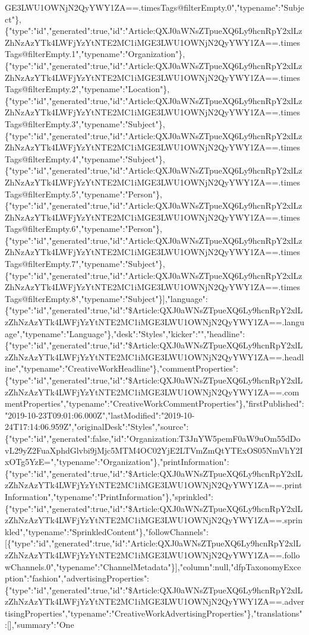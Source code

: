 GE3LWU1OWNjN2QyYWY1ZA==.timesTags@filterEmpty.0","typename":"Subject"\},\{"type":"id","generated":true,"id":"Article:QXJ0aWNsZTpueXQ6Ly9hcnRpY2xlLzZhNzAzYTk4LWFjYzYtNTE2MC1iMGE3LWU1OWNjN2QyYWY1ZA==.timesTags@filterEmpty.1","typename":"Organization"\},\{"type":"id","generated":true,"id":"Article:QXJ0aWNsZTpueXQ6Ly9hcnRpY2xlLzZhNzAzYTk4LWFjYzYtNTE2MC1iMGE3LWU1OWNjN2QyYWY1ZA==.timesTags@filterEmpty.2","typename":"Location"\},\{"type":"id","generated":true,"id":"Article:QXJ0aWNsZTpueXQ6Ly9hcnRpY2xlLzZhNzAzYTk4LWFjYzYtNTE2MC1iMGE3LWU1OWNjN2QyYWY1ZA==.timesTags@filterEmpty.3","typename":"Subject"\},\{"type":"id","generated":true,"id":"Article:QXJ0aWNsZTpueXQ6Ly9hcnRpY2xlLzZhNzAzYTk4LWFjYzYtNTE2MC1iMGE3LWU1OWNjN2QyYWY1ZA==.timesTags@filterEmpty.4","typename":"Subject"\},\{"type":"id","generated":true,"id":"Article:QXJ0aWNsZTpueXQ6Ly9hcnRpY2xlLzZhNzAzYTk4LWFjYzYtNTE2MC1iMGE3LWU1OWNjN2QyYWY1ZA==.timesTags@filterEmpty.5","typename":"Person"\},\{"type":"id","generated":true,"id":"Article:QXJ0aWNsZTpueXQ6Ly9hcnRpY2xlLzZhNzAzYTk4LWFjYzYtNTE2MC1iMGE3LWU1OWNjN2QyYWY1ZA==.timesTags@filterEmpty.6","typename":"Person"\},\{"type":"id","generated":true,"id":"Article:QXJ0aWNsZTpueXQ6Ly9hcnRpY2xlLzZhNzAzYTk4LWFjYzYtNTE2MC1iMGE3LWU1OWNjN2QyYWY1ZA==.timesTags@filterEmpty.7","typename":"Subject"\},\{"type":"id","generated":true,"id":"Article:QXJ0aWNsZTpueXQ6Ly9hcnRpY2xlLzZhNzAzYTk4LWFjYzYtNTE2MC1iMGE3LWU1OWNjN2QyYWY1ZA==.timesTags@filterEmpty.8","typename":"Subject"\}{]},"language":\{"type":"id","generated":true,"id":"\$Article:QXJ0aWNsZTpueXQ6Ly9hcnRpY2xlLzZhNzAzYTk4LWFjYzYtNTE2MC1iMGE3LWU1OWNjN2QyYWY1ZA==.language","typename":"Language"\},"desk":"Styles","kicker":"","headline":\{"type":"id","generated":true,"id":"\$Article:QXJ0aWNsZTpueXQ6Ly9hcnRpY2xlLzZhNzAzYTk4LWFjYzYtNTE2MC1iMGE3LWU1OWNjN2QyYWY1ZA==.headline","typename":"CreativeWorkHeadline"\},"commentProperties":\{"type":"id","generated":true,"id":"\$Article:QXJ0aWNsZTpueXQ6Ly9hcnRpY2xlLzZhNzAzYTk4LWFjYzYtNTE2MC1iMGE3LWU1OWNjN2QyYWY1ZA==.commentProperties","typename":"CreativeWorkCommentProperties"\},"firstPublished":"2019-10-23T09:01:06.000Z","lastModified":"2019-10-24T17:14:06.959Z","originalDesk":"Styles","source":\{"type":"id","generated":false,"id":"Organization:T3JnYW5pemF0aW9uOm55dDovL29yZ2FuaXphdGlvbi9jMjc5MTM4OC02YjE2LTVmZmQtYTExOS05NmVhY2IxOTg5YzE=","typename":"Organization"\},"printInformation":\{"type":"id","generated":true,"id":"\$Article:QXJ0aWNsZTpueXQ6Ly9hcnRpY2xlLzZhNzAzYTk4LWFjYzYtNTE2MC1iMGE3LWU1OWNjN2QyYWY1ZA==.printInformation","typename":"PrintInformation"\},"sprinkled":\{"type":"id","generated":true,"id":"\$Article:QXJ0aWNsZTpueXQ6Ly9hcnRpY2xlLzZhNzAzYTk4LWFjYzYtNTE2MC1iMGE3LWU1OWNjN2QyYWY1ZA==.sprinkled","typename":"SprinkledContent"\},"followChannels":{[}\{"type":"id","generated":true,"id":"Article:QXJ0aWNsZTpueXQ6Ly9hcnRpY2xlLzZhNzAzYTk4LWFjYzYtNTE2MC1iMGE3LWU1OWNjN2QyYWY1ZA==.followChannels.0","typename":"ChannelMetadata"\}{]},"column":null,"dfpTaxonomyException":"fashion","advertisingProperties":\{"type":"id","generated":true,"id":"\$Article:QXJ0aWNsZTpueXQ6Ly9hcnRpY2xlLzZhNzAzYTk4LWFjYzYtNTE2MC1iMGE3LWU1OWNjN2QyYWY1ZA==.advertisingProperties","typename":"CreativeWorkAdvertisingProperties"\},"translations":{[}{]},"summary":"One
